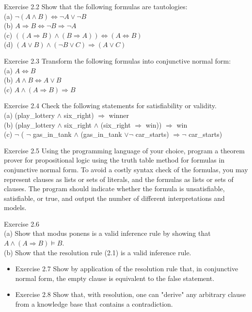 \documentclass[10pt]{book}
\begin{document}
Exercise 2.2 Show that the following formulas are tautologies:\\
(a) $\neg(A \wedge B) \Leftrightarrow \neg A \vee \neg B$\\
(b) $A \Rightarrow B \Leftrightarrow \neg B \Rightarrow \neg A$\\
(c) $((A \Rightarrow B) \wedge(B \Rightarrow A)) \Leftrightarrow(A \Leftrightarrow B)$\\
(d) $(A \vee B) \wedge(\neg B \vee C) \Rightarrow(A \vee C)$

Exercise 2.3 Transform the following formulas into conjunctive normal form:\\
(a) $A \Leftrightarrow B$\\
(b) $A \wedge B \Leftrightarrow A \vee B$\\
(c) $A \wedge(A \Rightarrow B) \Rightarrow B$

Exercise 2.4 Check the following statements for satisfiability or validity.\\
(a) (play\_lottery $\wedge$ six\_right) $\Rightarrow$ winner\\
(b) (play\_lottery $\wedge$ six\_right $\wedge$ (six\_right $\Rightarrow$ win)) $\Rightarrow$ win\\
(c) $\neg$ ( $\neg$ gas\_in\_tank $\wedge$ (gas\_in\_tank $\vee \neg$ car\_starts) $\Rightarrow \neg$ car\_starts)

Exercise 2.5 Using the programming language of your choice, program a theorem prover for propositional logic using the truth table method for formulas in conjunctive normal form. To avoid a costly syntax check of the formulas, you may represent clauses as lists or sets of literals, and the formulas as lists or sets of clauses. The program should indicate whether the formula is unsatisfiable, satisfiable, or true, and output the number of different interpretations and models.

Exercise 2.6\\
(a) Show that modus ponens is a valid inference rule by showing that $A \wedge(A \Rightarrow B) \models B$.\\
(b) Show that the resolution rule (2.1) is a valid inference rule.

\begin{itemize}
  \item Exercise 2.7 Show by application of the resolution rule that, in conjunctive normal form, the empty clause is equivalent to the false statement.
  \item Exercise 2.8 Show that, with resolution, one can "derive" any arbitrary clause from a knowledge base that contains a contradiction.
\end{itemize}
\end{document}
